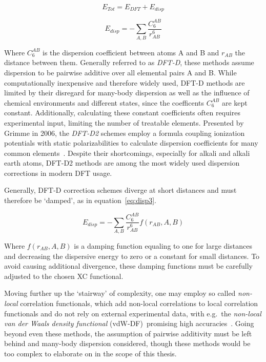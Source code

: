 \documentclass[11pt]{article}
\begin{document}
\begin{equation}
  E_{Tot} = E_{DFT} + E_{disp}
  \label{eq:disp1}
\end{equation}

\begin{equation}
  E_{disp} = - \sum_{A,B}\frac{C_{6}^{AB}}{r^6_{AB}}
  \label{eq:disp2}
\end{equation}

\bigskip

\noindent Where $C_{6}^{AB}$ is the dispersion coefficient between atoms A and B and $r_{AB}$ the distance between them.
Generally referred to as \textit{DFT-D}, these methods assume dispersion to be pairwise additive over all elemental pairs A and B.
While computationally inexpensive and therefore widely used, DFT-D methods are limited by their disregard for many-body dispersion as well as the influence of chemical environments and different states, since the coefficents $C_{6}^{AB}$ are kept constant.
Additionally, calculating these constant coefficients often requires experimental input, limiting the number of treatable elements.
Presented by Grimme in 2006, the \textit{DFT-D2} schemes employ a formula coupling ionization potentials with static polarizabilities to calculate dispersion coefficients for many common elements~\cite{Grimme2006}.
Despite their shortcomings, especially for alkali and alkali earth atoms, DFT-D2 methods are among the most widely used dispersion corrections in modern DFT usage.
\\ \par \noindent Generally, DFT-D correction schemes diverge at short distances and must therefore be `damped', as in equation~\ref{eq:disp3}.

\begin{equation}
  E_{disp} = - \sum_{A,B}\frac{C_{6}^{AB}}{r^6_{AB}}f(r_{AB},A,B)
  \label{eq:disp3}
\end{equation}

\bigskip

\noindent Where $f(r_{AB},A,B)$ is a damping function equaling to one for large distances and decreasing the dispersive energy to zero or a constant for small distances.
To avoid causing additional divergence, these damping functions must be carefully adjusted to the chosen XC functional.
\\ \par \noindent Moving further up the `stairway' of complexity, one may employ so called \textit{non-local} correlation functionals, which add non-local correlations to local correlation functionals and do not rely on external experimental data, with e.g.~the \textit{non-local van der Waals density functional} (vdW-DF)~promising high accuracies~\cite{Klime2009_vdW-DF}.
Going beyond even these methods, the assumption of pairwise additivity must be left behind and many-body dispersion considered, though these methods would be too complex to elaborate on in the scope of this thesis.
\end{document}
